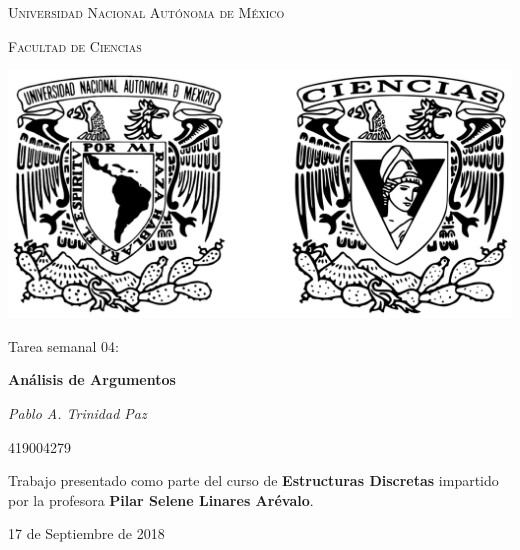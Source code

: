 \documentclass[11pt,letterpaper]{article}
\begin{document}
\begin{titlepage}
    \centering

    {\scshape\LARGE Universidad Nacional Autónoma de México \par}

    \vspace{1cm}
    {\scshape\Large Facultad de Ciencias\par}
    \vspace{1.5cm}

    \begin{center}
        \includegraphics[scale=.1]{../../assets/img/logo.png}
    \end{center}

    \vspace{.8 cm}

    {\LARGE Tarea semanal 04: \par}
    {\huge\bfseries Análisis de Argumentos \par}

    \vspace{0.5cm}
    {\large\itshape Pablo A. Trinidad Paz\par}
    419004279

    \vfill

    Trabajo presentado como parte del curso de \textbf{Estructuras Discretas}
    impartido por la profesora \textbf{Pilar Selene Linares Arévalo}. \par
    \vspace{0.1cm}
    {\large 17 de Septiembre de 2018\par}
\end{titlepage}
\end{document}

